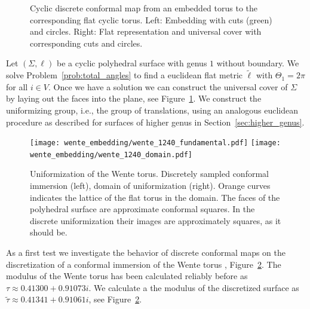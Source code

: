 \documentclass[Thesis]{subfiles}
\begin{document}
\begin{figure}
\centering
{}
\caption{
Cyclic discrete conformal map from an embedded torus to the corresponding flat cyclic torus.
Left: Embedding with cuts (green) and circles. 
Right: Flat representation and universal cover with corresponding cuts and circles.
}
\label{fig:torus_cyclic}
\end{figure}

Let $(\Sigma, \ell)$ be a cyclic polyhedral surface with genus $1$ without boundary. 
We solve Problem~\ref{prob:total_angles} to find a euclidean flat metric $\tilde \ell$ with $\Theta_1=2\pi$ for all $i\in V$.
Once we have a solution we can construct the universal cover of $\Sigma$ by laying out the faces into the plane, see Figure~\ref{fig:torus_cyclic}. We construct the uniformizing group, i.e., the group of translations, using an analogous euclidean procedure as described for surfaces of higher genus in Section~\ref{sec:higher_genus}.

\begin{figure}
\centering
\texttt{[image: wente\_embedding/wente\_1240\_fundamental.pdf]}\hfill
\texttt{[image: wente\_embedding/wente\_1240\_domain.pdf]}
\caption{Uniformization of the Wente torus. Discretely sampled conformal immersion (left), domain of uniformization (right). Orange curves indicates the lattice of the flat torus in the domain. The faces of the polyhedral surface are approximate conformal squares. In the discrete uniformization their images are approximately squares, as it should be.}
\label{fig:wente_torus_embedded}
\end{figure}

As a first test we investigate the behavior of discrete conformal maps on the discretization of a conformal immersion of the Wente torus \cite{wente1986}, Figure~\ref{fig:wente_torus_embedded}. 
The modulus of the Wente torus has been calculated reliably before \cite{Heil95} as $\tau \approx 0.41300+0.91073i$.
We calculate a the modulus of the discretized surface as $\tilde \tau \approx 0.41341+0.91061i$, see Figure~\ref{fig:wente_torus_embedded}.
\end{document}
